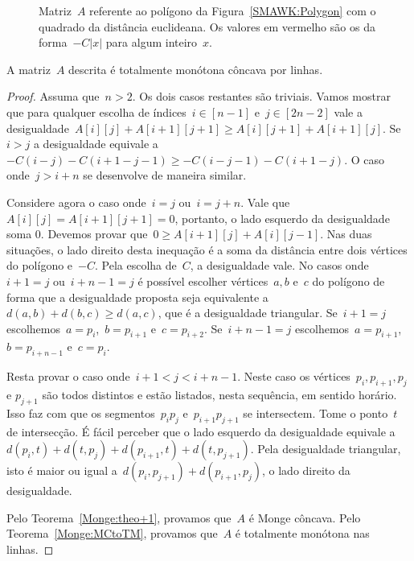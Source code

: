 \begin{figure}[h]
    \centering
    
    \caption{Matriz~$A$ referente ao polígono da Figura~\ref{SMAWK:Polygon} com o quadrado da distância euclideana. Os valores em vermelho são os da forma~$-C|x|$ para algum inteiro~$x$.}
\end{figure}

\begin{prop}
A matriz~$A$ descrita é totalmente monótona côncava por linhas.
\end{prop}

\begin{proof}
Assuma que~$n > 2$. Os dois casos restantes são triviais. Vamos mostrar que para qualquer escolha de índices~${ i \in [n-1] }$ e~${ j \in [2n-2] }$ vale a desigualdade~${ A[i][j] + A[i+1][j+1] \geq A[i][j+1] + A[i+1][j] }$. Se~$i > j$ a desigualdade equivale a~${ -C(i - j) - C(i + 1 - j - 1) \geq -C(i - j - 1) - C(i + 1 - j) }$. O caso onde~${ j > i + n} $ se desenvolve de maneira similar.

Considere agora o caso onde~$i = j$ ou~$i = j + n$. Vale que~$A[i][j] = A[i+1][j+1] = 0$, portanto, o lado esquerdo da desigualdade soma 0. Devemos provar que~$0 \geq A[i+1][j] + A[i][j-1]$. Nas duas situações, o lado direito desta inequação é a soma da distância entre dois vértices do polígono e~$-C$. Pela escolha de~$C$, a desigualdade vale. No casos onde~$i + 1 = j$ ou~$i + n - 1 = j$ é possível escolher vértices~$a,b$ e~$c$ do polígono de forma que a desigualdade proposta seja equivalente a~$d(a,b) + d(b,c) \geq d(a,c)$, que é a desigualdade triangular. Se~$i+1 = j$ escolhemos~$a = p_i$,~$b = p_{i+1}$ e~$c = p_{i+2}$. Se~$i+n-1 = j$ escolhemos~$a = p_{i+1}$,~$b = p_{i+n-1}$ e~$c = p_{i}$.

Resta provar o caso onde~$i + 1 < j < i + n - 1$. Neste caso os vértices~$p_i,p_{i+1},p_j$ e $p_{j+1}$ são todos distintos e estão listados, nesta sequência, em sentido horário. Isso faz com que os segmentos~$p_ip_j$ e~$p_{i+1}p_{j+1}$ se intersectem. Tome o ponto~$t$ de intersecção. É fácil perceber que o lado esquerdo da desigualdade equivale a~$d(p_i,t) + d(t,p_j) + d(p_{i+1},t) + d(t,p_{j+1})$. Pela desigualdade triangular, isto é maior ou igual a~$d(p_i,p_{j+1}) + d(p_{i+1},p_j)$, o lado direito da desigualdade.

Pelo Teorema~\ref{Monge:theo+1}, provamos que~$A$ é Monge côncava. Pelo Teorema~\ref{Monge:MCtoTM}, provamos que~$A$ é totalmente monótona nas linhas.
\end{proof}

